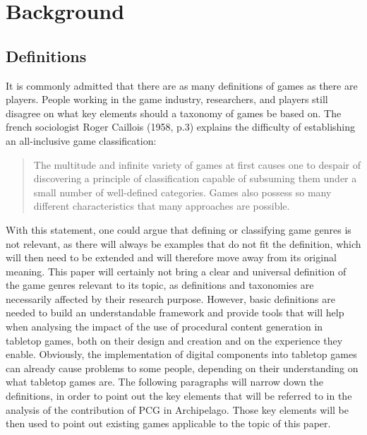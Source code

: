 \section{Background}
\subsection{Definitions}
It is commonly admitted that there are as many definitions of games as there are players. People working in the game industry, researchers, and players still disagree on what key elements should a taxonomy of games be based on. The french sociologist Roger Caillois (1958, p.3) explains the difficulty of establishing an all-inclusive game classification:
\begin{quotation}
The multitude and infinite variety of games at first causes one to despair of discovering a principle of classification capable of subsuming them under a small number of well-defined categories. Games also possess so many different characteristics that many approaches are possible.
\end{quotation} 
With this statement, one could argue that defining or classifying game genres is not relevant, as there will always be examples that do not fit the definition, which will then need to be extended and will therefore move away from its original meaning. This paper will certainly not bring a clear and universal definition of the game genres relevant to its topic, as definitions and taxonomies are necessarily affected by their research purpose. However, basic definitions are needed to build an understandable framework and provide tools that will help when analysing the impact of the use of procedural content generation in tabletop games, both on their design and creation and on the experience they enable.
Obviously, the implementation of digital components into tabletop games can already cause problems to some people, depending on their understanding on what tabletop games are. The following paragraphs will narrow down the definitions, in order to point out the key elements that will be referred to in the analysis of the contribution of PCG in Archipelago. Those key elements will be then used to point out existing games applicable to the topic of this paper.

